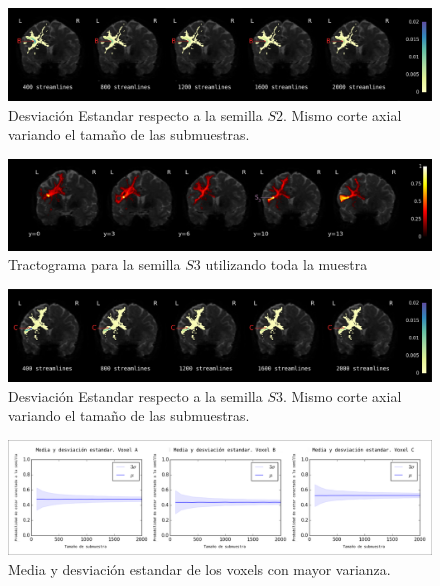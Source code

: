 \begin{figure}[h!]
   \centering
    \includegraphics[width=\textwidth]{img/s2.png}
    \caption{Desviaci\'on Estandar respecto a la semilla $S2$. Mismo corte axial
             variando el tama\~no de las submuestras.}
    \label{fig:s2}
\end{figure}

\begin{figure}[h!]
   \centering
    \includegraphics[width=\textwidth]{img/m3.png}
    \caption{Tractograma para la semilla $S3$ utilizando toda la muestra}
    \label{fig:m3}
\end{figure}

\begin{figure}[h!]
   \centering
    \includegraphics[width=\textwidth]{img/s3.png}
    \caption{Desviaci\'on Estandar respecto a la semilla $S3$. Mismo corte axial
             variando el tama\~no de las submuestras.}
    \label{fig:s3}
\end{figure}

\begin{figure}[h!]
   \centering
    \includegraphics[width=\textwidth]{img/med_var_all.png}
    \caption{Media y desviaci\'on estandar de los voxels con mayor varianza.}
    \label{fig:mv}
\end{figure}
